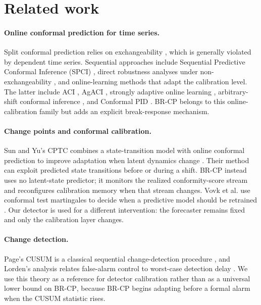 \documentclass[10pt]{article}
\newcommand{\brcp}{\textsc{BR-CP}}
\begin{document}
\section{Related work}
\label{sec:related}

\paragraph{Online conformal prediction for time series.}
Split conformal prediction relies on exchangeability \citep{papadopoulos2002inductive,lei2018distribution}, which is generally violated by dependent time series. Sequential approaches include Sequential Predictive Conformal Inference (SPCI) \citep{xu2023sequential}, direct robustness analyses under non-exchangeability \citep{barber2023beyond}, and online-learning methods that adapt the calibration level. The latter include ACI \citep{gibbs2021adaptive}, AgACI \citep{zaffran2022adaptive}, strongly adaptive online learning \citep{bhatnagar2023improved}, arbitrary-shift conformal inference \citep{gibbs2024conformal}, and Conformal PID \citep{angelopoulos2023conformal}. \brcp{} belongs to this online-calibration family but adds an explicit break-response mechanism.

\paragraph{Change points and conformal calibration.}
Sun and Yu's CPTC combines a state-transition model with online conformal prediction to improve adaptation when latent dynamics change \citep{sun2025cptc}. Their method can exploit predicted state transitions before or during a shift. \brcp{} instead uses no latent-state predictor; it monitors the realized conformity-score stream and reconfigures calibration memory when that stream changes. Vovk et al. use conformal test martingales to decide when a predictive model should be retrained \citep{vovk2021retrain}. Our detector is used for a different intervention: the forecaster remains fixed and only the calibration layer changes.

\paragraph{Change detection.}
Page's CUSUM is a classical sequential change-detection procedure \citep{page1954}, and Lorden's analysis relates false-alarm control to worst-case detection delay \citep{lorden1971procedures}. We use this theory as a reference for detector calibration rather than as a universal lower bound on \brcp{}, because \brcp{} begins adapting before a formal alarm when the CUSUM statistic rises.
\end{document}
